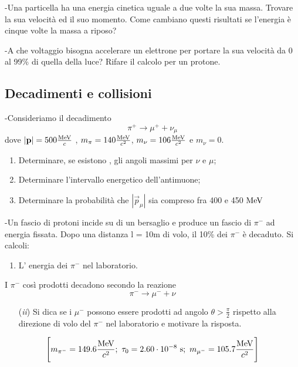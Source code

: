 \documentclass[12pt,twoside,a4]{article}
\begin{document}
\newpage
\begin{esercizio}
	-Una particella ha una energia cinetica uguale a due volte la sua massa. Trovare la sua velocità  ed il suo momento. Come cambiano questi risultati se l'energia  è cinque volte la massa a riposo?
\end{esercizio}

\begin{esercizio}
	-A che voltaggio bisogna accelerare un elettrone per portare la sua velocità  da 0 al 99\% di quella della luce? Rifare il calcolo per un protone.
\end{esercizio}


\newpage
\subsection{Decadimenti e collisioni}
\begin{esercizio}
	-Consideriamo il decadimento
\begin{equation*}
	\pi^+ \rightarrow \mu ^+ + \nu_\mu
\end{equation*}
dove $| \textbf p | = 500 \frac{\mathrm{MeV}}{c}$ , $m_\pi=140 \frac{\mathrm{MeV}}{c^2}$, $m_\nu=106 \frac{\mathrm{MeV}}{c^2}$ e $m_\nu=0$. 
\begin{enumerate}[label=(\textit{\roman*})]
	\item Determinare, se esistono , gli angoli massimi per $\nu$ e $\mu$;
	\item Determinare l'intervallo energetico dell'antimuone;
	\item Determinare la probabilità  che $| \vec p_\mu|$ sia compreso fra 400 e 450 $\mathrm{MeV}$
\end{enumerate}
\end{esercizio}

\begin{esercizio}
	-Un fascio di protoni incide su di un bersaglio e produce un fascio di $\pi^-$ ad energia fissata. Dopo una distanza l = 10m di volo, il 10\% dei $\pi^-$ è decaduto. Si calcoli:
	\begin{enumerate}[label=(\textit{\roman*})]
		\item L' energia dei $\pi^-$ nel laboratorio.
	\end{enumerate}
	I $\pi^-$ così prodotti decadono secondo la reazione
\begin{equation*}
	\pi^- \rightarrow \mu^- + \nu
\end{equation*}
\begin{enumerate}[label=(\textit{\roman*})]
	\item[(\textit{ii})] Si dica se i $\mu^-$ possono essere prodotti ad angolo $\theta > \frac{\pi}{2}$ rispetto alla direzione di volo del $\pi^-$ nel laboratorio e motivare la risposta.
\end{enumerate}
\begin{equation*} 
	\Bigg[ m_{\pi^-}= 149.6 \frac{\mev}{c^2}; \ \tau_{0} = 2.60 \cdot 10^{-8} \ \mathrm{s}; \ m_{\mu^-} = 105.7 \frac{\mev}{c^2} \Bigg]
\end{equation*}
\end{esercizio}
\end{document}
